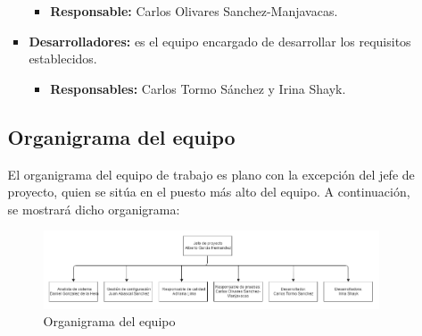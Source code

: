 \begin{itemize}
\begin{itemize}
\begin{itemize}
  \begin{itemize}
  \item \textbf{Responsable:} Carlos Olivares Sanchez-Manjavacas.
  \end{itemize}
\item \textbf{Desarrolladores:} es el equipo encargado de desarrollar los requisitos establecidos.
  \begin{itemize}
  \item \textbf{Responsables:} Carlos Tormo Sánchez y Irina Shayk.
  \end{itemize}
\end{itemize}

\subsection {Organigrama del equipo}
\par El organigrama del equipo de trabajo es plano con la excepción del jefe de proyecto, quien se sitúa en el puesto más alto del equipo. A continuación, se mostrará dicho organigrama:

\begin{figure}[H]
\begin{center}
\includegraphics[width=1\textwidth]{./img/Org.png}
\end{center}
\caption{Organigrama del equipo}
\label{tab:horasTotales}
\end{figure}



\end{itemize}
\end{itemize}
